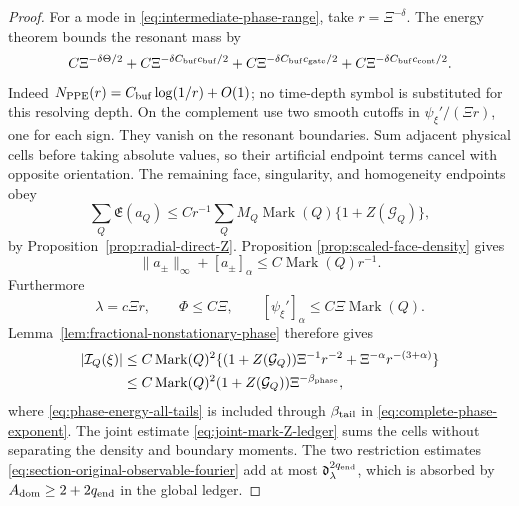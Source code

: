 \documentclass[11pt]{article}
\begin{document}
\begin{proof}
For a mode in \eqref{eq:intermediate-phase-range}, take
\(r=\Xi^{-\delta}\).  The energy theorem bounds the resonant mass by
\begin{equation}
\label{eq:phase-energy-all-tails}
 C\Xi^{-\delta\Theta/2}
 +C\Xi^{-\delta C_{\rm buf}c_{\rm buf}/2}
 +C\Xi^{-\delta C_{\rm buf}c_{\rm gate}/2}
 +C\Xi^{-\delta C_{\rm buf}c_{\rm cont}/2}.
\end{equation}
Indeed $N_{\rm PPE}(r)=C_{\rm buf}\log(1/r)+O(1)$; no time-depth symbol is
substituted for this resolving depth.  On the complement use two smooth
cutoffs in
\(\psi_\xi'/(\Xi r)\), one for each sign.  They vanish on the resonant
boundaries.  Sum adjacent physical cells before taking absolute values, so
their artificial endpoint terms cancel with opposite orientation.  The
remaining face, singularity, and homogeneity endpoints obey
\begin{equation}
\label{eq:phase-endpoint-ledger}
 \sum_Q\mathfrak E(a_Q)
 \le Cr^{-1}\sum_QM_Q\operatorname{Mark}(Q)
       \{1+Z(\mathcal G_Q)\},
\end{equation}
by Proposition~\ref{prop:radial-direct-Z}.  Proposition
\ref{prop:scaled-face-density} gives
\[
 \|a_\pm\|_\infty+[a_\pm]_\alpha
 \le C\operatorname{Mark}(Q) r^{-1}.
\]
Furthermore
\[
 \lambda=c\Xi r,\qquad
 \Phi\le C\Xi,\qquad
 [\psi_\xi']_\alpha\le C\Xi\operatorname{Mark}(Q).
\]
Lemma~\ref{lem:fractional-nonstationary-phase} therefore gives
\begin{align*}
 |\mathcal I_Q(\xi)|
 &\le C\operatorname{Mark}(Q)^2
 \{(1+Z(\mathcal G_Q))\Xi^{-1}r^{-2}
        +\Xi^{-\alpha}r^{-(3+\alpha)}\}\\
 &\le C\operatorname{Mark}(Q)^2(1+Z(\mathcal G_Q))
       \Xi^{-\beta_{\rm phase}},
\end{align*}
where \eqref{eq:phase-energy-all-tails} is included through
$\beta_{\rm tail}$ in \eqref{eq:complete-phase-exponent}.
The joint estimate \eqref{eq:joint-mark-Z-ledger} sums the cells without
separating the density and boundary moments.  The two restriction estimates
\eqref{eq:section-original-observable-fourier} add at most
$\mathfrak d_\lambda^{2q_{\rm end}}$, which is absorbed by
$A_{\rm dom}\ge2+2q_{\rm end}$ in the global ledger.


\end{proof}
\end{document}
